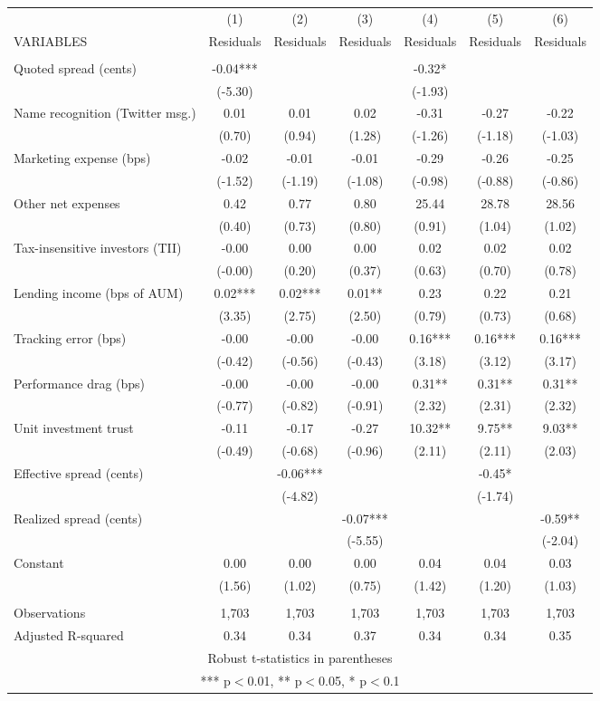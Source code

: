 \documentclass[]{article}
\begin{document}
\begin{tabular}{lcccccc} \hline
 & (1) & (2) & (3) & (4) & (5) & (6) \\
VARIABLES & Residuals & Residuals & Residuals & Residuals & Residuals & Residuals \\ \hline
 &  &  &  &  &  &  \\
Quoted spread (cents) & -0.04*** &  &  & -0.32* &  &  \\
 & (-5.30) &  &  & (-1.93) &  &  \\
Name recognition (Twitter msg.) & 0.01 & 0.01 & 0.02 & -0.31 & -0.27 & -0.22 \\
 & (0.70) & (0.94) & (1.28) & (-1.26) & (-1.18) & (-1.03) \\
Marketing expense (bps) & -0.02 & -0.01 & -0.01 & -0.29 & -0.26 & -0.25 \\
 & (-1.52) & (-1.19) & (-1.08) & (-0.98) & (-0.88) & (-0.86) \\
Other net expenses & 0.42 & 0.77 & 0.80 & 25.44 & 28.78 & 28.56 \\
 & (0.40) & (0.73) & (0.80) & (0.91) & (1.04) & (1.02) \\
Tax-insensitive investors (TII) & -0.00 & 0.00 & 0.00 & 0.02 & 0.02 & 0.02 \\
 & (-0.00) & (0.20) & (0.37) & (0.63) & (0.70) & (0.78) \\
Lending income (bps of AUM) & 0.02*** & 0.02*** & 0.01** & 0.23 & 0.22 & 0.21 \\
 & (3.35) & (2.75) & (2.50) & (0.79) & (0.73) & (0.68) \\
Tracking error (bps) & -0.00 & -0.00 & -0.00 & 0.16*** & 0.16*** & 0.16*** \\
 & (-0.42) & (-0.56) & (-0.43) & (3.18) & (3.12) & (3.17) \\
Performance drag (bps) & -0.00 & -0.00 & -0.00 & 0.31** & 0.31** & 0.31** \\
 & (-0.77) & (-0.82) & (-0.91) & (2.32) & (2.31) & (2.32) \\
Unit investment trust & -0.11 & -0.17 & -0.27 & 10.32** & 9.75** & 9.03** \\
 & (-0.49) & (-0.68) & (-0.96) & (2.11) & (2.11) & (2.03) \\
Effective spread (cents) &  & -0.06*** &  &  & -0.45* &  \\
 &  & (-4.82) &  &  & (-1.74) &  \\
Realized spread (cents) &  &  & -0.07*** &  &  & -0.59** \\
 &  &  & (-5.55) &  &  & (-2.04) \\
Constant & 0.00 & 0.00 & 0.00 & 0.04 & 0.04 & 0.03 \\
 & (1.56) & (1.02) & (0.75) & (1.42) & (1.20) & (1.03) \\
 &  &  &  &  &  &  \\
Observations & 1,703 & 1,703 & 1,703 & 1,703 & 1,703 & 1,703 \\
 Adjusted R-squared & 0.34 & 0.34 & 0.37 & 0.34 & 0.34 & 0.35 \\ \hline
\multicolumn{7}{c}{ Robust t-statistics in parentheses} \\
\multicolumn{7}{c}{ *** p$<$0.01, ** p$<$0.05, * p$<$0.1} \\
\end{tabular}
\end{document}
